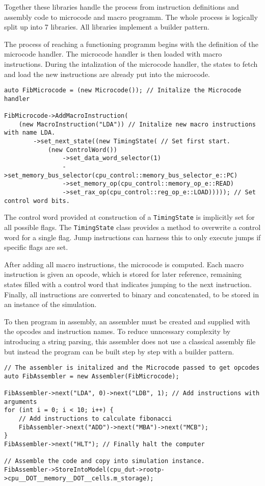 Together these libraries handle the process from instruction definitions and assembly code to microcode and macro programm. The whole process is logically split up into 7 libraries. All libraries implement a builder pattern. 

The process of reaching a functioning programm begins with the definition of the microcode handler. The microcode handler is then loaded with macro instructions. During the intalization of the microcode handler, the states to fetch and load the new instructions are already put into the microcode.

\begin{lstlisting}[caption=Inialization of the Microcode]
auto FibMicrocode = (new Microcode()); // Initalize the Microcode handler

FibMicrocode->AddMacroInstruction( 
    (new MacroInstruction("LDA")) // Initalize new macro instructions with name LDA. 
        ->set_next_state((new TimingState( // Set first start. 
            (new ControlWord()) 
                ->set_data_word_selector(1)
                ->set_memory_bus_selector(cpu_control::memory_bus_selector_e::PC)
                ->set_memory_op(cpu_control::memory_op_e::READ)
                ->set_rax_op(cpu_control::reg_op_e::LOAD))))); // Set control word bits.
\end{lstlisting}

The control word provided at construction of a \texttt{TimingState} is implicitly set for all possible flags. The \texttt{TimingState} class provides a method to overwrite a control word for a single flag. Jump instructions can harness this to only execute jumps if specific flags are set.

After adding all macro instructions, the microcode is computed. Each macro instruction is given an opcode, which is stored for later reference, remaining states filled with a control word that indicates jumping to the next instruction. Finally, all instructions are converted to binary and concatenated, to be stored in an instance of the simulation. 

To then program in assembly, an assembler must be created and supplied with the opcodes and instruction names. To reduce unncessary complexity by introducing a string parsing, this assembler does not use a classical assembly file but instead the program can be built step by step with a builder pattern. 
\begin{lstlisting}[caption=Inialization of Assembler and programming of macrocode ]
// The assembler is initalized and the Microcode passed to get opcodes
auto FibAssembler = new Assembler(FibMicrocode); 

FibAssembler->next("LDA", 0)->next("LDB", 1); // Add instructions with arguments
for (int i = 0; i < 10; i++) {
    // Add instructions to calculate fibonacci
    FibAssembler->next("ADD")->next("MBA")->next("MCB"); 
}
FibAssembler->next("HLT"); // Finally halt the computer

// Assemble the code and copy into simulation instance.
FibAssembler->StoreIntoModel(cpu_dut->rootp->cpu__DOT__memory__DOT__cells.m_storage); 
\end{lstlisting}


